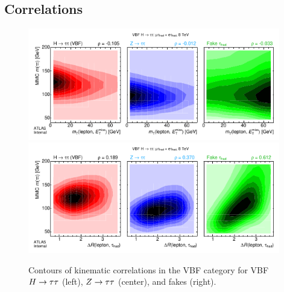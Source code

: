 

\subsection{Correlations}
\label{sec:strategy-mva-correlations}

\clearpage

\begin{figure}[tp]
  \centering
  \includegraphics[width=0.98\textwidth]{figures/kinematiccorrelations/mT-vs-mMMC}
  \includegraphics[width=0.98\textwidth]{figures/kinematiccorrelations/taulep_dR-vs-mMMC}
  \caption{Contours of kinematic correlations in the VBF category for VBF $H\rightarrow\tau\tau$ (left), $Z\rightarrow\tau\tau$ (center), and fakes (right).}
  \label{fig:strategy-kinematic-correlations-1}
\end{figure}


